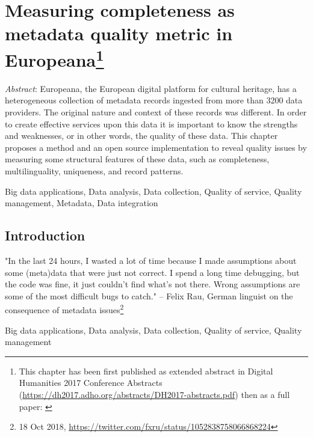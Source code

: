 \chapter[Measuring completeness as metadata quality metric in Europeana]{Measuring completeness as metadata quality metric in Europeana\footnote{This chapter has been first published as extended abstract in Digital Humanities 2017 Conference
Abstracts (\url{https://dh2017.adho.org/abstracts/DH2017-abstracts.pdf}) then as a full paper: \cite{kiraly2018}}}

\emph{Abstract}: Europeana, the European digital platform for cultural heritage, has a heterogeneous collection of metadata records ingested from more than 3200 data providers. The original nature and context of these records was different. In order to create effective services upon this data it is important to know the strengths and weaknesses, or in other words, the quality of these data. This chapter proposes a method and an open source implementation to reveal quality issues by measuring some structural features of these data, such as completeness, multilinguality, uniqueness, and record patterns.

Big data applications, Data analysis, Data collection, Quality of service, Quality management, Metadata, Data integration

\section{Introduction}

\begin{displayquote}
"In the last 24 hours, I wasted a lot of time because I made assumptions about some (meta)data that were just not correct. I spend a long time debugging, but the code was fine, it just couldn’t find what’s not there. Wrong assumptions are some of the most difficult bugs to catch." -- Felix Rau, German linguist on the consequence of metadata issues\footnote{18 Oct 2018, \url{https://twitter.com/fxru/status/1052838758066868224}}
\end{displayquote}
Big data applications, Data analysis, Data collection, Quality of service, Quality management 
\bigskip

